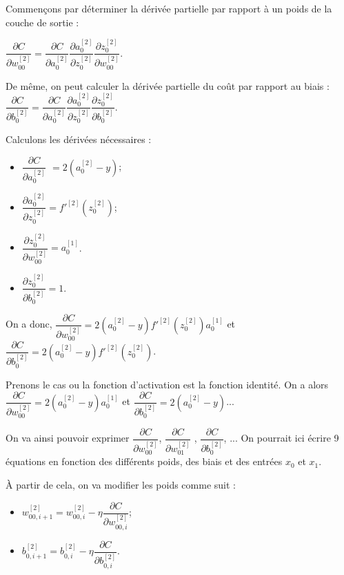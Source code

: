 Commençons par déterminer la dérivée partielle par rapport à un poids de la couche de sortie : 

$\dfrac{\partial C}{\partial w^{[2]}_{00}}=\dfrac{\partial C}{\partial a^{[2]}_{0}}\dfrac{\partial  a^{[2]}_{0}}{\partial z^{[2]}_{0}}\dfrac{\partial z^{[2]}_{0}}{\partial w^{[2]}_{00}}$.

De même, on peut calculer la dérivée partielle du coût par rapport au biais : 
$\dfrac{\partial C}{\partial b^{[2]}_{0}}=\dfrac{\partial C}{\partial a^{[2]}_{0}}\dfrac{\partial  a^{[2]}_{0}}{\partial z^{[2]}_{0}}\dfrac{\partial z^{[2]}_{0}}{\partial b^{[2]}_{0}}$.

Calculons les dérivées nécessaires : 
\begin{multicols}{4}
\begin{itemize}
\item $\dfrac{\partial C}{\partial a^{[2]}_{0}}$ $= 2\left( a^{[2]}_{0} - y  \right)$;
\item $ \dfrac{\partial  a^{[2]}_{0}}{\partial z^{[2]}_{0}} = f'^{[2]}\left(z_0^{[2]}\right)$;
\item $\dfrac{\partial z^{[2]}_{0}}{\partial w^{[2]}_{00}}  = a_0^{[1]} $.
\item $\dfrac{\partial z^{[2]}_{0}}{\partial b^{[2]}_{0}} = 1$.
\end{itemize}
\end{multicols}

On a donc, 
$\dfrac{\partial C}{\partial w^{[2]}_{00}} = 2\left( a^{[2]}_{0} - y  \right)  f'^{[2]}\left(z_0^{[2]}\right) a_0^{[1]}$
et 
$\dfrac{\partial C}{\partial b^{[2]}_{0}} = 2\left( a^{[2]}_{0} - y  \right)  f'^{[2]}\left(z_0^{[2]}\right) $.

Prenons le cas ou la fonction d'activation est la fonction identité. 
On a alors
$\dfrac{\partial C}{\partial w^{[2]}_{00}} = 2\left( a^{[2]}_{0} - y  \right)   a_0^{[1]}$
et 
$\dfrac{\partial C}{\partial b^{[2]}_{0}} = 2\left( a^{[2]}_{0} - y  \right)   $...

On va ainsi pouvoir exprimer $\dfrac{\partial C}{\partial w^{[2]}_{00}}$, $\dfrac{\partial C}{\partial w^{[2]}_{01}}$ , $\dfrac{\partial C}{\partial b^{[2]}_{0}}$, ... 
On pourrait ici écrire 9 équations en fonction des différents poids, des biais et des entrées $x_0$ et $x_1$.  

\`A partir de cela, on va modifier les poids comme suit : 
\begin{itemize}
\item $ w^{[2]}_{00,i+1}=w^{[2]}_{00,i}-\eta  \dfrac{\partial C}{\partial w^{[2]}_{00,i}}$;
\item $ b^{[2]}_{0,i+1}=b^{[2]}_{0,i}-\eta  \dfrac{\partial C}{\partial b^{[2]}_{0,i}}$.
\end{itemize}

